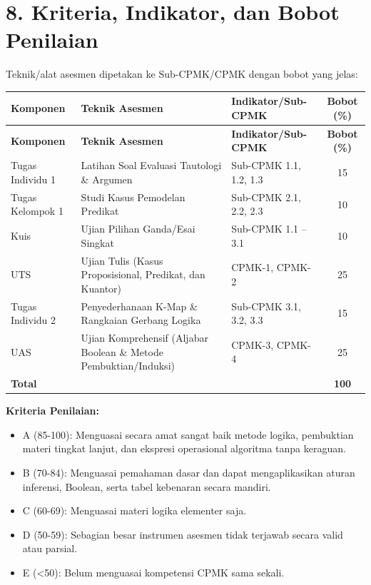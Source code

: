 \documentclass[12pt,a4paper]{article}
\begin{document}
\vspace{0.5cm}

\section*{8. Kriteria, Indikator, dan Bobot Penilaian}

Teknik/alat asesmen dipetakan ke Sub-CPMK/CPMK dengan bobot yang jelas:

\begin{longtable}{|>{\raggedright\arraybackslash}p{2.5cm}|>{\raggedright\arraybackslash}p{4cm}|>{\raggedright\arraybackslash}p{5.5cm}|c|}
\hline
\textbf{Komponen} & \textbf{Teknik Asesmen} & \textbf{Indikator/Sub-CPMK} & \textbf{Bobot (\%)} \\
\hline
\endfirsthead
\hline
\textbf{Komponen} & \textbf{Teknik Asesmen} & \textbf{Indikator/Sub-CPMK} & \textbf{Bobot (\%)} \\
\hline
\endhead
\hline
\endfoot

Tugas Individu 1 & Latihan Soal Evaluasi Tautologi \& Argumen & Sub-CPMK 1.1, 1.2, 1.3 & 15 \\
\hline
Tugas Kelompok 1 & Studi Kasus Pemodelan Predikat & Sub-CPMK 2.1, 2.2, 2.3 & 10 \\
\hline
Kuis & Ujian Pilihan Ganda/Esai Singkat & Sub-CPMK 1.1 -- 3.1 & 10 \\
\hline
UTS & Ujian Tulis (Kasus Proposisional, Predikat, dan Kuantor) & CPMK-1, CPMK-2 & 25 \\
\hline
Tugas Individu 2 & Penyederhanaan K-Map \& Rangkaian Gerbang Logika & Sub-CPMK 3.1, 3.2, 3.3 & 15 \\
\hline
UAS & Ujian Komprehensif (Aljabar Boolean \& Metode Pembuktian/Induksi) & CPMK-3, CPMK-4 & 25 \\
\hline
\textbf{Total} & & & \textbf{100} \\
\hline
\end{longtable}

\textbf{Kriteria Penilaian:}
\begin{itemize}[leftmargin=*]
  \item A (85-100): Menguasai secara amat sangat baik metode logika, pembuktian materi tingkat lanjut, dan ekspresi operasional algoritma tanpa keraguan.
  \item B (70-84): Menguasai pemahaman dasar dan dapat mengaplikasikan aturan inferensi, Boolean, serta tabel kebenaran secara mandiri.
  \item C (60-69): Menguasai materi logika elementer saja.
  \item D (50-59): Sebagian besar instrumen asesmen tidak terjawab secara valid atau parsial.
  \item E (<50): Belum menguasai kompetensi CPMK sama sekali.
\end{itemize}
\end{document}
